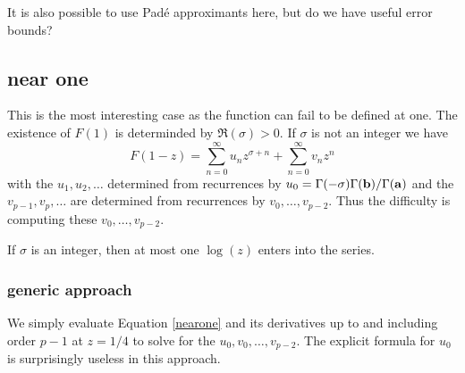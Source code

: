 \documentclass[10pt]{article}
\numberwithin{equation}{section}
\begin{document}
It is also possible to use Pad\'e approximants here, but do we have useful error bounds?

\subsection{near one}

This is the most interesting case as the function can fail to be defined at one. The existence of $F(1)$ is determinded by $\Re(\sigma)> 0$. If $\sigma$ is not an integer we have
\begin{equation}
\label{nearone}
F(1-z) = \sum_{n=0}^{\infty} u_n z^{\sigma+n} + \sum_{n=0}^{\infty} v_n z^n
\end{equation}
with the $u_1,u_2,\dots$ determined from recurrences by $u_0 = \Gamma(-\sigma)\Gamma(\bold{b})/\Gamma(\bold{a})$ and the $v_{p-1}, v_p, \dots$ are determined from recurrences by $v_0, \dots, v_{p-2}$. Thus the difficulty is computing these $v_0, \dots, v_{p-2}$.

If $\sigma$ is an integer, then at most one $\log(z)$ enters into the series.
\subsubsection{generic approach}
We simply evaluate Equation \eqref{nearone} and its derivatives up to and including order $p-1$ at $z=1/4$ to solve for the $u_0,v_0,\dots,v_{p-2}$. The explicit formula for $u_0$ is surprisingly useless in this approach.
\end{document}
